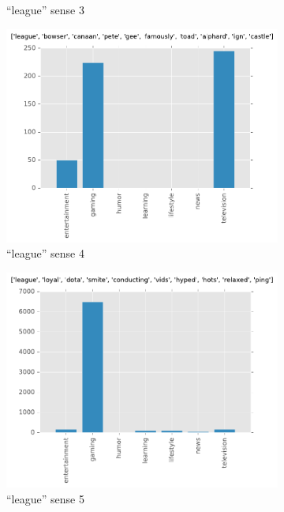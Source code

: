 \begin{landscape}
\begin{figure}[H]
\begin{subfigure}[t]{.3\textwidth}
\caption{``league'' sense 3}
\label{fig-reddit-league-2}
\end{subfigure}
\begin{subfigure}[t]{.3\textwidth}
\centering\includegraphics[]{figures/reddit-league-3.pdf}
\caption{``league'' sense 4}
\label{fig-reddit-league-3}
\end{subfigure}
\begin{subfigure}[t]{.3\textwidth}
\centering\includegraphics[]{figures/reddit-league-4.pdf}
\caption{``league'' sense 5}
\label{fig-reddit-league-4}
\end{subfigure}
\begin{subfigure}[t]{.3\textwidth}

\end{subfigure}
\end{figure}
\end{landscape}

